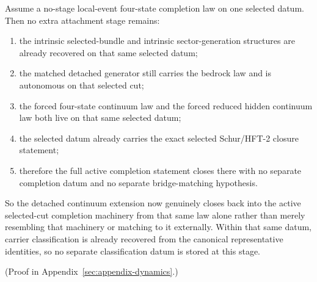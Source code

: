 \begin{theorem}
\label{thm:matched-no-stage-continuum-law-closes-on-the-active-selected-datum}
Assume a no-stage local-event four-state completion law on one selected datum.
Then no extra attachment stage remains:
\begin{enumerate}
\item the intrinsic selected-bundle and intrinsic sector-generation structures
      are already recovered on that same selected datum;
\item the matched detached generator still carries the bedrock law and is
      autonomous on that selected cut;
\item the forced four-state continuum law and the forced reduced hidden
      continuum law both live on that same selected datum;
\item the selected datum already carries the exact selected Schur/HFT-2
      closure statement;
\item therefore the full active completion statement closes there
      with no separate completion datum and no separate bridge-matching
      hypothesis.
\end{enumerate}
So the detached continuum extension now genuinely closes back into the active
selected-cut completion machinery from that same law alone rather than
merely resembling that machinery or matching to it externally.
Within that same datum, carrier classification is already recovered from the
canonical representative identities, so no separate classification datum is
stored at this stage.
\end{theorem}

(Proof in Appendix~\ref{sec:appendix-dynamics}.)

